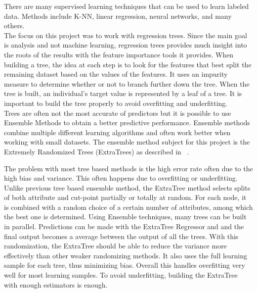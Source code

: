 \documentclass[a4paper,11pt]{report}
\numberwithin{figure}{section} %
\begin{document}
    There are many supervised learning techniques that can be used to learn labeled data.
    Methods include K-NN, linear regression, neural networks, and many others.\\

    The focus on this project was to work with regression trees.
    Since the main goal is analysis and not machine learning, regression trees provides much insight into the roots of the results with the feature importance tools it provides.
    When building a tree, the idea at each step is to look for the features that best split the remaining dataset based on the values of the features.
    It uses an impurity measure to determine whether or not to branch further down the tree.
    When the tree is built, an individual's target value is represented by a leaf of a tree.
    It is important to build the tree properly to avoid overfitting and underfitting.\\

    Trees are often not the most accurate of predictors but it is possible to use Ensemble Methods to obtain a better predictive performance.
    Ensemble methods combine multiple different learning algorithms and often work better when working with small datasets.
    The ensemble method subject for this project is the Extremely Randomized Trees (ExtraTrees) as described in ~\cite{extratree}.

    The problem with most tree based methods is the high error rate often due to the high bias and variance.
    This often happens due to overfitting or underfitting.
    Unlike previous tree based ensemble method, the ExtraTree method selects splits of both attribute and cut-point partially or totally at random.
    For each node, it is combined with a random choice of a certain number of attributes, among which the best one is determined.
    Using Ensemble techniques, many trees can be built in parallel.
    Predictions can be made with the ExtraTree Regressor and and the final output becomes a average between the output of all the trees.
    With this randomization, the ExtraTree should be able to reduce the variance more effectively than other weaker randomizing methods.
    It also uses the full learning sample for each tree, thus minimizing bias.
    Overall this handles overfitting very well for most learning samples.
    To avoid underfitting, building the ExtraTree with enough estimators is enough.\\
\end{document}
